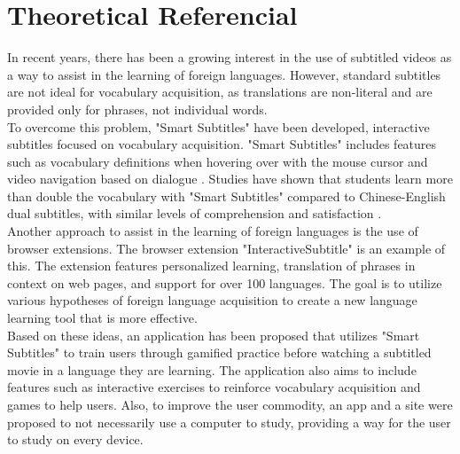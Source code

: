 \documentclass[12pt]{article}
\begin{document}
\section{Theoretical Referencial}
In recent years, there has been a growing interest in the use of subtitled videos as a way to assist in the learning of foreign languages. However, standard subtitles are not ideal for vocabulary acquisition, as translations are non-literal and are provided only for phrases, not individual words. \\
To overcome this problem, "Smart Subtitles" have been developed, interactive subtitles focused on vocabulary acquisition. "Smart Subtitles" includes features such as vocabulary definitions when hovering over with the mouse cursor and video navigation based on dialogue \cite{Kovacs13}. Studies have shown that students learn more than double the vocabulary with "Smart Subtitles" compared to Chinese-English dual subtitles, with similar levels of comprehension and satisfaction \cite{Kovacs14}. \\ 
Another approach to assist in the learning of foreign languages is the use of browser extensions. The browser extension "InteractiveSubtitle" \cite{ElBatanony21} is an example of this. The extension features personalized learning, translation of phrases in context on web pages, and support for over 100 languages. The goal is to utilize various hypotheses of foreign language acquisition to create a new language learning tool that is more effective. \\ 
Based on these ideas, an application has been proposed that utilizes "Smart Subtitles" to train users through gamified practice before watching a subtitled movie in a language they are learning. The application also aims to include features such as interactive exercises to reinforce vocabulary acquisition and games to help users. 
Also, to improve the user commodity, an app and a site were proposed to not necessarily use a computer to study, providing a way for the user to study on every device. 
\end{document}

